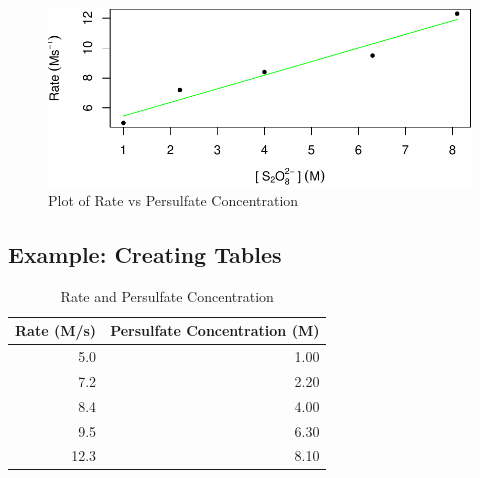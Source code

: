 \documentclass[
]{article}
\begin{document}
\begin{figure}
\centering
\includegraphics{skeleton_files/figure-latex/unnamed-chunk-6-1.pdf}
\caption{Plot of Rate vs Persulfate Concentration}
\end{figure}

\hypertarget{example-creating-tables}{%
\subsection{Example: Creating Tables}\label{example-creating-tables}}

\begin{table}[ht]
\centering
\parbox{2.7in}{\caption{Rate and Persulfate Concentration}} 
\begin{tabular}{|r|r|}
  \hline
\textbf{Rate (M/s)} & \textbf{Persulfate Concentration (M)} \\ 
  \hline
5.0 & 1.00 \\ 
   \hline
7.2 & 2.20 \\ 
   \hline
8.4 & 4.00 \\ 
   \hline
9.5 & 6.30 \\ 
   \hline
12.3 & 8.10 \\ 
   \hline
\end{tabular}
\end{table}
\end{document}
